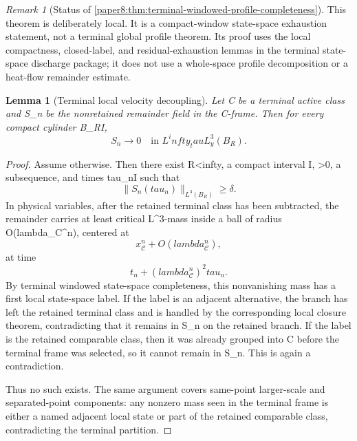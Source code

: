 \documentclass[11pt]{amsart}
\def\({}%
\def\){}%
\def\tau{tau}%
\def\lambda{lambda}%
\def\infty{infty}%
\theoremstyle{plain}
\newtheorem{lemma}[lemma]{Lemma}
\theoremstyle{definition}
\theoremstyle{remark}
\newtheorem{remark}[remark]{Remark}
\begin{document}
\begin{remark}[Status of \cref{paper8:thm:terminal-windowed-profile-completeness}]
\label{paper8:rem:terminal-completeness-replacement}
This theorem is deliberately local.  It is a compact-window state-space
exhaustion statement, not a terminal global profile theorem.  Its proof uses the
local compactness, closed-label, and residual-exhaustion lemmas in the terminal
state-space discharge package; it does not use a whole-space profile
decomposition or a heat-flow remainder estimate.
\end{remark}

\begin{lemma}[Terminal local velocity decoupling]
\label{paper8:lem:terminal-velocity-decoupling}
Let \(\mathcal C\) be a terminal active class and \(S_n\) be the nonretained
remainder field in the \(\mathcal C\)-frame.  Then for every compact cylinder
\(B_R\times I\),
\[
  S_n\to0
  \quad\text{in }L^\infty_\tau L^3_y(B_R).
\]
\end{lemma}

\begin{proof}
Assume otherwise.  Then there exist \(R<\infty\), a compact interval \(I\),
\(\delta>0\), a subsequence, and times \(\tau_n\in I\) such that
\[
  \|S_n(\tau_n)\|_{L^3(B_R)}\ge\delta.
\]
In physical variables, after the retained terminal class has been subtracted,
the remainder carries at least \(\delta\) critical \(L^3\)-mass inside a ball
of radius \(O(\lambda_{\mathcal C}^n)\), centered at
\[
  x_{\mathcal C}^n+O(\lambda_{\mathcal C}^n),
\]
at time
\[
  t_n+(\lambda_{\mathcal C}^n)^2\tau_n.
\]
By terminal windowed state-space completeness, this nonvanishing mass has a
first local state-space label.  If the label is an adjacent alternative, the
branch has left the retained terminal class and is handled by the corresponding
local closure theorem, contradicting that it remains in \(S_n\) on the retained
branch.  If the label is the retained comparable class, then it was already
grouped into \(\mathcal C\) before the terminal frame was selected, so it cannot
remain in \(S_n\).  This is again a contradiction.

Thus no such \(\delta\) exists.  The same argument covers same-point
larger-scale and separated-point components: any nonzero mass seen in the
terminal frame is either a named adjacent local state or part of the retained
comparable class, contradicting the terminal partition.
\end{proof}
\end{document}
